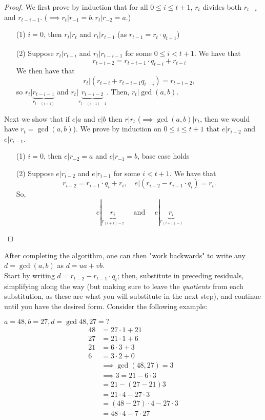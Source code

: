 \documentclass[12pt,oneside]{article}
\begin{document}
\begin{proof}
  We first prove by induction that for all $0 \leq i \leq t+1$, $r_t $ divides both $r_{t-i}$ and $r_{t-i-1}$. ($\implies r_t|r_{-1}=b, r_t|r_{-2}=a$.)\\
  \begin{itemize}
    \item[(1)] $i =0$, then $r_t | r_t$ and $r_t|r_{t-1}$ (as $r_{t-1} = r_{t}\cdot q_{t+1}$)
    \item[(2)] Suppose $r_t | r_{t-i}$ and $r_{t} | r_{t-i-1}$ for some $0 \leq i < t+1$. We have that $$r_{t-i-2} = r_{t-i-1} \cdot q_{t-i} + r_{t-i}$$ We then have that $$r_t | (r_{t-i} + r_{t-i-1}q_{t-i}) = r_{t-i-2},$$ so $r_t | \underbrace{r_{t-i-1}}_{r_{t-(i+1)}}$ and $r_t | \underbrace{r_{t-i-2}}_{r_{t-(i+1)-1}}.$ Then, $r_t | \gcd(a,b).$
  \end{itemize}
  Next we show that if $e|a$ and $e|b$ then $r|r_t$ ($\implies \gcd(a,b)|r_t$, then we would have $r_t = \gcd(a,b)$). We prove by induction on $0 \leq i \leq t+1$ that $e | r_{i-2}$ and $e | r_{i-1}$.
  \begin{itemize}
    \item[(1)] $i = 0$, then $e|r_{-2} = a$ and $e|r_{-1} =b$, base case holds
    \item[(2)] Suppose $e|r_{i-2}$ and $e|r_{i-1}$ for some $i < t+1$. We have that $$r_{i-2} = r_{i-1}\cdot q_i + r_i, \quad e|(r_{i-2} - r_{i-1}\cdot q_i) = r_i.$$
    So, $$e|\underbrace{r_i}_{r_{(i+1)-2}} \quad \text{ and } \quad e|\underbrace{r_i}_{r_{(i+1)-1}}$$
  \end{itemize}
\end{proof}

\begin{remark}
  After completing the algorithm, one can then "work backwards" to write any $d = \gcd(a,b)$ as $d = ua + vb$.\\
  Start by writing $d = r_{t-2} - r_{t-1}\cdot q_t$; then, substitute in preceding residuals, simplifying along the way (but making sure to leave the \emph{quotients} from each substitution, as these are what you will substitute in the next step), and continue until you have the desired form. Consider the following example:
\end{remark}

\begin{example}
  $a = 48, b = 27, d = \gcd{48,27}=?$
  \begin{align*}
    48 &= 27 \cdot 1 + 21\\
    27 &= 21 \cdot 1 + 6\\
    21 &= 6 \cdot 3 + 3\\
    6 &= 3 \cdot 2 + 0\\
    &\implies\gcd(48,27)=3\\
    &\implies 3 = 21 - 6 \cdot 3\\
     &= 21 - (27-21)3 \\
     &= 21\cdot 4 - 27\cdot 3\\
     &= (48-27)\cdot 4 - 27\cdot 3\\
     &= 48 \cdot 4 - 7 \cdot 27
  \end{align*}
\end{example}
\end{document}
